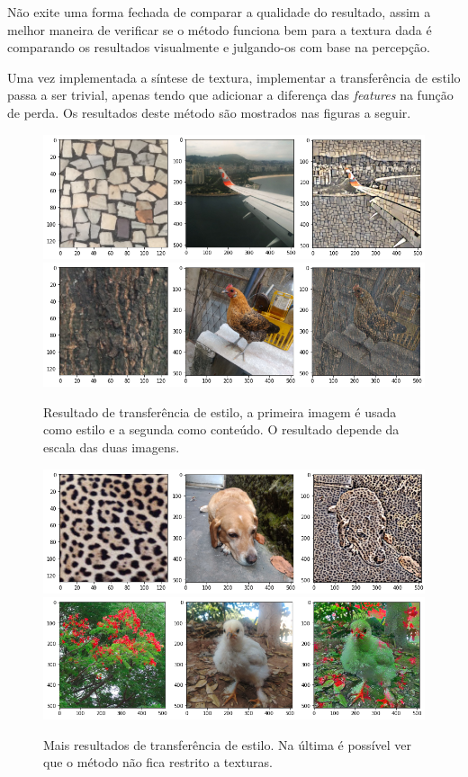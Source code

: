 Não exite uma forma fechada de comparar a qualidade
do resultado, assim a melhor maneira de verificar
se o método funciona bem para a textura dada
é comparando os resultados visualmente e julgando-os
com base na percepção.

Uma vez implementada a síntese de textura, implementar
a transferência de estilo passa a ser trivial,
apenas tendo que adicionar a diferença das \textit{features}
na função de perda. Os resultados deste método são mostrados nas
figuras a seguir.



\begin{figure}[!ht]
	\centering
	\includegraphics[width=\linewidth]{files/assets/results/air1.png}
	\includegraphics[width=\linewidth]{files/assets/results/galinha1.png}
	\caption{Resultado de transferência de estilo, a primeira imagem
	é usada como estilo e a segunda como conteúdo. O resultado
	depende da escala das duas imagens.}
	\label{img:preview}
\end{figure}
\begin{figure}[!ht]
	\centering
	\includegraphics[width=\linewidth]{files/assets/results/magali.png}
	\includegraphics[width=\linewidth]{files/assets/results/galinha2.png}
	\caption{Mais resultados de transferência de estilo. Na última é
	possível ver que o método não fica restrito a texturas.}
	\label{img:preview}
\end{figure}




